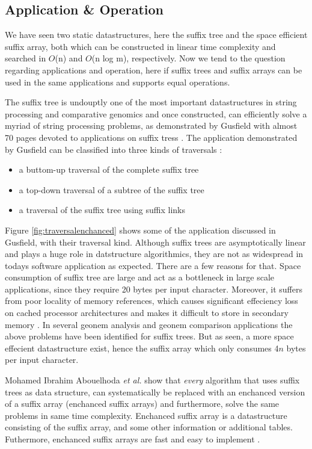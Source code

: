 \documentclass[12pt]{article} %
\begin{document}
\subsection{Application \& Operation}

We have seen two static datastructures, here the suffix tree and the space efficient suffix array, both which can be constructed in linear time complexity and searched in $O$(n) and $O$(n log m), respectively. Now we tend to the question regarding applications and operation, here if suffix trees and suffix arrays can be used in the same applications and supports equal operations. 

The suffix tree is undouptly one of the most important datastructures in string processing and comparative genomics and once constructed, can efficiently solve a myriad of string processing problems, as demonstrated by Gusfield with almost 70 pages devoted to applications on suffix tress \cite{gusfield, enchancedsuffix}. The application demonstrated by Gusfield can be classified into three kinds of traversals \cite{enchancedsuffix}:
\begin{itemize}  
\item a buttom-up traversal of the complete suffix tree 
\item a top-down traversal of a subtree of the suffix tree 
\item a traversal of the suffix tree using suffix links 
\end{itemize}
Figure \ref{fig:traversalenchanced} shows some of the application discussed in Gusfield, with their traversal kind. Although suffix trees are asymptotically linear and plays a huge role in datstructure algorithmics, they are not as widespread in todays software application as expected. There are a few reasons for that. Space consumption of suffix tree are large and act as a bottleneck in large scale applications, since they require 20 bytes per input character. Moreover, it suffers from poor locality of memory references, which causes significant effeciency loss on cached processor architectures and makes it difficult to store in secondary memory \cite{enchancedsuffix}. In several geonem analysis and geonem comparison applications the above problems have been identified for suffix trees. But as seen, a more space effecient datastructure exist, hence the suffix array which only consumes 4$n$ bytes per input character\cite{enchancedsuffix}.   
 
Mohamed Ibrahim Abouelhoda \emph{et al.} \cite{enchancedsuffix} show that \emph{every} algorithm that uses suffix trees as data structure, can systematically be replaced with an enchanced version of a suffix array (enchanced suffix arrays) and furthermore, solve the same problems in same time complexity. Enchanced suffix array is a datastructure consisting of the suffix array, and some other information or additional tables. Futhermore, enchanced suffix arrays are fast and easy to implement \cite{enchancedsuffix}.
\end{document}
